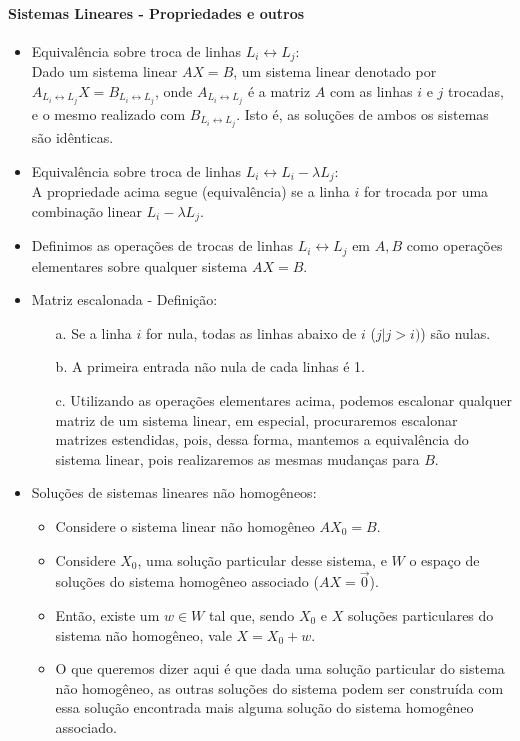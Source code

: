 \documentclass[12pt]{article}
\begin{document}
\paragraph{Sistemas Lineares - Propriedades e outros}

\begin{itemize}
	\item Equivalência sobre troca de linhas $L_i \leftrightarrow L_j$:\\
		Dado um sistema linear $AX=B$, um sistema linear denotado por\\
		$A_{L_i \leftrightarrow L_j}X = B_{L_i \leftrightarrow L_j}$, onde $A_{L_i \leftrightarrow L_j}$ é
		a matriz $A$ com as linhas $i$ e $j$ trocadas, e o mesmo realizado com $B_{L_i \leftrightarrow L_j}$.
		Isto é, as soluções de ambos os sistemas são idênticas.
		
	\item Equivalência sobre troca de linhas $L_i \leftrightarrow L_i - \lambda L_j$:\\
		A propriedade acima segue (equivalência) se a linha $i$ for trocada por uma combinação linear $L_i - \lambda L_j$.
		
	\item Definimos as operações de trocas de linhas $L_i \leftrightarrow L_j$ em $A,B$ como operações elementares sobre qualquer
	sistema $AX=B$.
	
	\item Matriz escalonada - Definição:
	\begin{itemize}
		\item[a.] Se a linha $i$ for nula, todas as linhas abaixo de $i$ ($j \vert j > i)$) são nulas.
		\item[b.] A primeira entrada não nula de cada linhas é 1.
		\item[c.] Utilizando as operações elementares acima, podemos escalonar qualquer matriz de um sistema linear, em especial, procuraremos
		escalonar matrizes estendidas, pois, dessa forma, mantemos a equivalência do sistema linear, pois realizaremos as mesmas mudanças
		para $B$.
	\end{itemize}
	
	\item Soluções de sistemas lineares não homogêneos:
	\begin{itemize}
		\item Considere o sistema linear não homogêneo $AX_0 = B$.
		\item Considere $X_0$, uma solução particular desse sistema, e $W$ o espaço de soluções do sistema homogêneo associado
		($AX = \overrightarrow{0}$).
		\item Então, existe um $w \in W$ tal que, sendo $X_0$ e $X$ soluções particulares do sistema não homogêneo, vale $X = X_0 + w$.
		\item O que queremos dizer aqui é que dada uma solução particular do sistema não homogêneo, as outras soluções do sistema podem
		ser construída com essa solução encontrada mais alguma solução do sistema homogêneo associado.
	\end{itemize}
\end{itemize}
\end{document}

